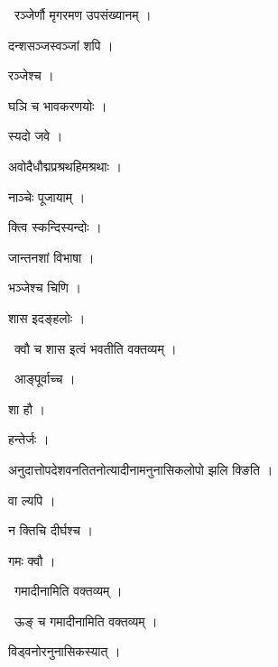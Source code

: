 \documentclass[10pt, openany, oneside]{book}
\begin{document}
\par\noindent\hspace{1.5em}{\vps वा॰}~{\qt रञ्जेर्णौ मृगरमण उपसंख्यानम् ।}

\noindent दन्शसञ्जस्वञ्जां शपि ।

\noindent रञ्जेश्च ।

\noindent घञि च भावकरणयोः ।

\noindent स्यदो जवे ।

\noindent अवोदैधौद्मप्रश्रथहिमश्रथाः ।

\noindent नाञ्चेः पूजायाम् ।

\noindent क्त्वि स्कन्दिस्यन्दोः ।

\noindent जान्तनशां विभाषा ।

\noindent भञ्जेश्च चिणि ।

\noindent शास इदङ्हलोः ।

\par\noindent\hspace{1.5em}{\vps वा॰}~{\qt क्वौ च शास इत्वं भवतीति वक्तव्यम् ।}

\par\noindent\hspace{1.5em}{\vps वा॰}~{\qt आङ्पूर्वाच्च ।}

\noindent शा हौ ।

\noindent हन्तेर्जः ।

\noindent अनुदात्तोपदेशवनतितनोत्यादीनामनुनासिकलोपो झलि क्ङिति ।

\noindent वा ल्यपि ।

\noindent न क्तिचि दीर्घश्च ।

\noindent गमः क्वौ ।

\par\noindent\hspace{1.5em}{\vps वा॰}~{\qt गमादीनामिति वक्तव्यम् ।}

\par\noindent\hspace{1.5em}{\vps वा॰}~{\qt ऊङ् च गमादीनामिति वक्तव्यम् ।}

\noindent विड्वनोरनुनासिकस्यात् ।
\end{document}
